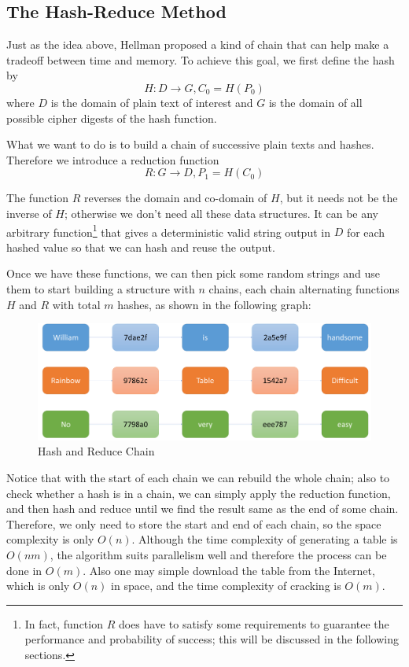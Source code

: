 \documentclass{article}
\begin{document}
\begin{multicols}{2}
\subsection{The Hash-Reduce Method}
Just as the idea above, Hellman\cite{hellman1980cryptanalytic} proposed a kind of chain that can help make a tradeoff between time and memory. To achieve this goal, we first define the hash by $$H:D\to G, C_0=H(P_0)$$
where $D$ is the domain of plain text of interest and $G$ is the domain of all possible cipher digests of the hash function. 

What we want to do is to build a chain of successive plain texts and hashes. Therefore we introduce a reduction function $$R:G\to D, P_1 = H(C_0)$$

The function $R$ reverses the domain and co-domain of $H$, but it needs not be the inverse of $H$; otherwise we don't need all these data structures. It can be any arbitrary function\footnote{In fact, function $R$ does have to satisfy some requirements to guarantee the performance and probability of success; this will be discussed in the following sections.} that gives a deterministic valid string output in $D$ for each hashed value so that we can hash and reuse the output.

Once we have these functions, we can then pick some random strings and use them to start building a structure with $n$ chains, each chain alternating functions $H$ and $R$ with total $m$ hashes, as shown in the following graph:

\begin{figure}[H]
	\centering
	\includegraphics[width=\linewidth]{img/hashReduce}
	\caption{Hash and Reduce Chain}
	\label{fig:hashReduce}
\end{figure}

Notice that with the start of each chain we can rebuild the whole chain; also to check whether a hash is in a chain, we can simply apply the reduction function, and then hash and reduce until we find the result same as the end of some chain. Therefore, we only need to store the start and end of each chain, so the space complexity is only $O(n)$. Although the time complexity of generating a table is $O(nm)$, the algorithm suits parallelism well and therefore the process can be done in $O(m)$. Also one may simple download the table from the Internet, which is only $O(n)$ in space, and the time complexity of cracking is $O(m)$.


\end{multicols}
\end{document}
